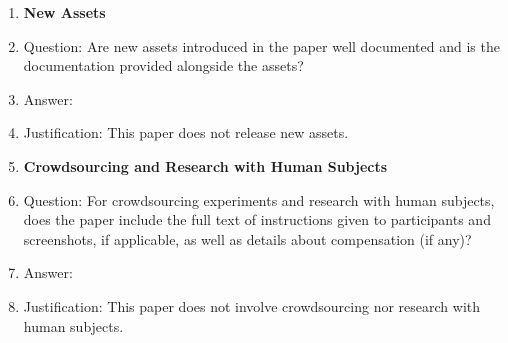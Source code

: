 \begin{enumerate}
\item {\bf New Assets}
    \item[] Question: Are new assets introduced in the paper well documented and is the documentation provided alongside the assets?
    \item[] Answer:  \answerNA{}%
    \item[] Justification: This paper does not release new assets.

\item {\bf Crowdsourcing and Research with Human Subjects}
    \item[] Question: For crowdsourcing experiments and research with human subjects, does the paper include the full text of instructions given to participants and screenshots, if applicable, as well as details about compensation (if any)? 
    \item[] Answer:  \answerNA{} %
    \item[] Justification: This paper does not involve crowdsourcing nor research with human subjects.


\end{enumerate}
